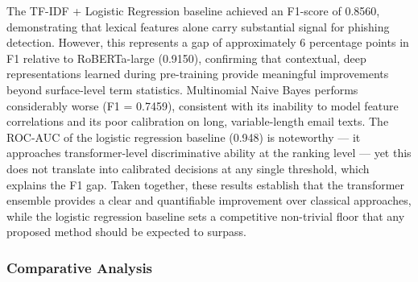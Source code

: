 \begin{table}[htbp]
\centering
\caption[Phishing detection results on the held-out test set]{Phishing detection results on the held-out test set for classical baselines and fine-tuned transformer models.}
\label{tab:baseline_comparison}
\end{table}

The TF-IDF + Logistic Regression baseline achieved an F1-score of 0.8560, demonstrating that lexical features alone carry substantial signal for phishing detection. However, this represents a gap of approximately 6 percentage points in F1 relative to \acs{RoBERTa}-large (0.9150), confirming that contextual, deep representations learned during pre-training provide meaningful improvements beyond surface-level term statistics. Multinomial Naive Bayes performs considerably worse (F1 = 0.7459), consistent with its inability to model feature correlations and its poor calibration on long, variable-length email texts. The ROC-AUC of the logistic regression baseline (0.948) is noteworthy --- it approaches transformer-level discriminative ability at the ranking level --- yet this does not translate into calibrated decisions at any single threshold, which explains the F1 gap. Taken together, these results establish that the transformer ensemble provides a clear and quantifiable improvement over classical approaches, while the logistic regression baseline sets a competitive non-trivial floor that any proposed method should be expected to surpass.

\subsubsection{Comparative Analysis}
\label{sec:evaluation}

